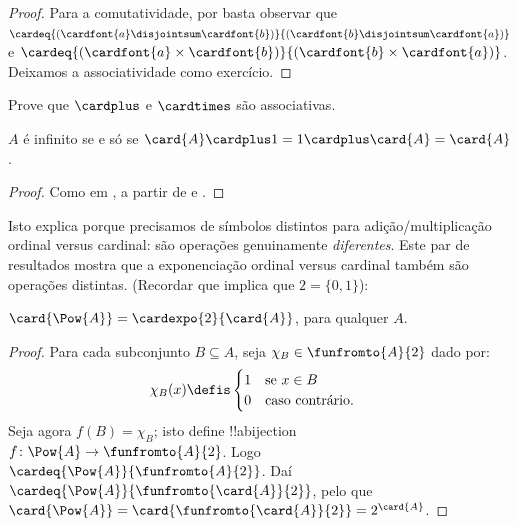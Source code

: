 \documentclass[../../../include/open-logic-section]{subfiles}
\begin{document}
\begin{proof}
Para a comutatividade, por
 basta
observar que $\cardeq{(\cardfont{a} \disjointsum
\cardfont{b})}{(\cardfont{b} \disjointsum \cardfont{a})}$ e
$\cardeq{(\cardfont{a} \times \cardfont{b})}{(\cardfont{b} \times
\cardfont{a})}$. Deixamos a associatividade como exercício.
\end{proof}

\begin{prob}
Prove que $\cardplus$ e $\cardtimes$ são associativas.
\end{prob}

\begin{prop}
$A$ é infinito se e só se $\card{A} \cardplus 1 = 1 \cardplus \card{A} = \card{A}$.
\end{prop}

\begin{proof}
Como em
, a partir de
 e
. 
\end{proof}

Isto explica porque precisamos de símbolos distintos para adição/multiplicação ordinal versus
cardinal: são operações genuinamente \emph{diferentes}.
Este par de resultados mostra que a exponenciação ordinal versus
cardinal também são operações distintas. (Recordar que
 implica que $2 = \{0,
1\}$):

\begin{lem}
$\card{\Pow{A}} = \cardexpo{2}{\card{A}}$, para qualquer $A$.
\end{lem}

\begin{proof}
Para cada subconjunto $B \subseteq A$, seja $\chi_B \in \funfromto{A}{2}$ dado por:
\begin{align*}
	\chi_{B}(x) &\defis
	\begin{cases}
		1 & \text{se }x\in B\\
		0 & \text{caso contrário.}
	\end{cases}
\end{align*}
Seja agora $f(B) = \chi_B$; isto define !!a{bijection} $f \colon \Pow{A}
\to \funfromto{A}{2}$. Logo $\cardeq{\Pow{A}}{\funfromto{A}{2}}$. Daí
$\cardeq{\Pow{A}}{\funfromto{\card{A}}{2}}$, pelo que
$\card{\Pow{A}} = \card{\funfromto{\card{A}}{2}} =
2^{\card{A}}$.
\end{proof}
\end{document}
